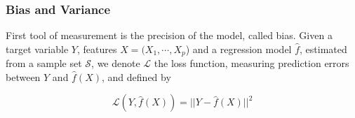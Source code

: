 \documentclass[english,11pt,openany]{article}
\theoremstyle{definition}
\newcommand\blankpage{%
	\null
	\thispagestyle{empty}%
	\addtocounter{page}{-1}%
	\newpage}
\theoremstyle{plain}
\theoremstyle{definition}
\begin{document}
\begin{appendices}
		\subsubsection{Bias and Variance}
		
		First tool of measurement is the precision of the model, called bias. Given a target variable $Y$, features $X = (X_1, \cdots, X_p$) and a regression model $\hat{f}$, estimated from a sample set $\mathcal{S}$, we denote $\mathcal{L}$ the loss function, measuring prediction errors between $Y$ and $\hat{f}(X)$, and defined by 
		
		\begin{displaymath}
		\mathcal{L}(Y, \hat{f}(X)) = ||Y - \hat{f}(X)||^2
		\end{displaymath}
		
		
	\end{appendices}
	
	\newpage
	\blankpage
	
	
	
\end{document}
